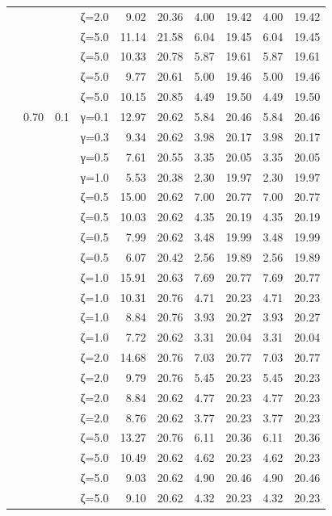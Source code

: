 \begin{table}[htbp]
\begin{tabular}{ll r l  rr  rr  rr}
  &  &  & ζ=2.0 & 9.02 & 20.36 & 4.00 & 19.42 & 4.00 & 19.42 \\
  &  &  & ζ=5.0 & 11.14 & 21.58 & 6.04 & 19.45 & 6.04 & 19.45 \\
  &  &  & ζ=5.0 & 10.33 & 20.78 & 5.87 & 19.61 & 5.87 & 19.61 \\
  &  &  & ζ=5.0 & 9.77 & 20.61 & 5.00 & 19.46 & 5.00 & 19.46 \\
  &  &  & ζ=5.0 & 10.15 & 20.85 & 4.49 & 19.50 & 4.49 & 19.50 \\
  & 0.70 & 0.1 & γ=0.1 & 12.97 & 20.62 & 5.84 & 20.46 & 5.84 & 20.46 \\
  &  &  & γ=0.3 & 9.34 & 20.62 & 3.98 & 20.17 & 3.98 & 20.17 \\
  &  &  & γ=0.5 & 7.61 & 20.55 & 3.35 & 20.05 & 3.35 & 20.05 \\
  &  &  & γ=1.0 & 5.53 & 20.38 & 2.30 & 19.97 & 2.30 & 19.97 \\
  &  &  & ζ=0.5 & 15.00 & 20.62 & 7.00 & 20.77 & 7.00 & 20.77 \\
  &  &  & ζ=0.5 & 10.03 & 20.62 & 4.35 & 20.19 & 4.35 & 20.19 \\
  &  &  & ζ=0.5 & 7.99 & 20.62 & 3.48 & 19.99 & 3.48 & 19.99 \\
  &  &  & ζ=0.5 & 6.07 & 20.42 & 2.56 & 19.89 & 2.56 & 19.89 \\
  &  &  & ζ=1.0 & 15.91 & 20.63 & 7.69 & 20.77 & 7.69 & 20.77 \\
  &  &  & ζ=1.0 & 10.31 & 20.76 & 4.71 & 20.23 & 4.71 & 20.23 \\
  &  &  & ζ=1.0 & 8.84 & 20.76 & 3.93 & 20.27 & 3.93 & 20.27 \\
  &  &  & ζ=1.0 & 7.72 & 20.62 & 3.31 & 20.04 & 3.31 & 20.04 \\
  &  &  & ζ=2.0 & 14.68 & 20.76 & 7.03 & 20.77 & 7.03 & 20.77 \\
  &  &  & ζ=2.0 & 9.79 & 20.76 & 5.45 & 20.23 & 5.45 & 20.23 \\
  &  &  & ζ=2.0 & 8.84 & 20.62 & 4.77 & 20.23 & 4.77 & 20.23 \\
  &  &  & ζ=2.0 & 8.76 & 20.62 & 3.77 & 20.23 & 3.77 & 20.23 \\
  &  &  & ζ=5.0 & 13.27 & 20.76 & 6.11 & 20.36 & 6.11 & 20.36 \\
  &  &  & ζ=5.0 & 10.49 & 20.62 & 4.62 & 20.23 & 4.62 & 20.23 \\
  &  &  & ζ=5.0 & 9.03 & 20.62 & 4.90 & 20.46 & 4.90 & 20.46 \\
  &  &  & ζ=5.0 & 9.10 & 20.62 & 4.32 & 20.23 & 4.32 & 20.23 \\

\end{tabular}
\end{table}
